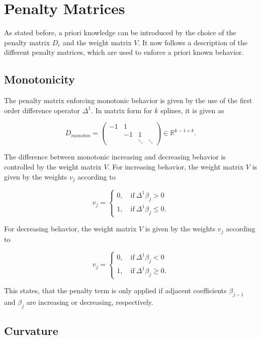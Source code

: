 					
\section{Penalty Matrices}


As stated before, a priori knowledge can be introduced by the choice of the penalty matrix $D_c$ and the weight matrix $V$. It now follows a description of the different penalty matrices, which are used to enforce a priori known behavior. 


\subsection{Monotonicity}

The penalty matrix enforcing monotonic behavior is given by the use of the first order difference operator $\Delta^1$. In matrix form for $k$ splines, it is given as

$$D_{monoton} = \begin{pmatrix} -1 & 1  \\ 
								& -1 & 1 \\ 
								& & \ddots & \ddots  
\end{pmatrix} \in \mathbb{R}^{k-1 \times k}.$$

The difference between monotonic increasing and decreasing behavior is controlled by the weight matrix $V$. For increasing behavior, the weight matrix $V$ is given by the weights $v_j$ according to

$$v_j = \begin{cases} 0, \quad \text{if} \ \Delta^1\beta_j > 0 \\ 
	      1, \quad \text{if} \ \Delta^1\beta_j \le 0.
		\end{cases}$$

For decreasing behavior, the weight matrix $V$ is given by the weights $v_j$ according to

$$v_j = \begin{cases} 0, \quad \text{if} \ \Delta^1\beta_j < 0 \\ 
			  1, \quad \text{if} \ \Delta^1\beta_j \ge 0.
		\end{cases}$$

This states, that the penalty term is only applied if adjacent coefficients $\beta_{j-1}$ and $\beta_j$ are increasing or decreasing, respectively. \cite{hofner2011monotonicity} \cite{eilers2005unimodal}

\subsection{Curvature}

